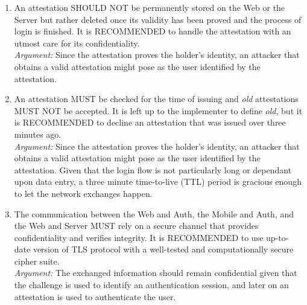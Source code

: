 \begin{enumerate}
            \item An attestation SHOULD NOT be permanently stored on the Web or the Server but rather deleted once its 
                  validity has been proved and the process of login is finished. It is RECOMMENDED to handle the 
                  attestation with an utmost care for its confidentiality.\\
            \textit{Argument:} Since the attestation proves the holder's identity, an attacker that obtains a valid
                               attestation might pose as the user identified by the attestation.

            \item An attestation MUST be checked for the time of issuing and \textit{old} attestations MUST NOT be
                  accepted. It is left up to the implementer to define \textit{old}, but it is RECOMMENDED to
                  decline an attestation that was issued over three minutes ago.\\
            \textit{Argument:} Since the attestation proves the holder's identity, an attacker that obtains a valid
                               attestation might pose as the user identified by the attestation. Given that the login
                               flow is not particularly long or dependant upon data entry, a three minute time-to-live 
                               (TTL) period is gracious enough to let the network exchanges happen.

            \item The communication between the Web and Auth, the Mobile and Auth, and the Web and Server MUST rely on 
                  a secure channel that provides confidentiality and verifies integrity. It is RECOMMENDED to use 
                  up-to-date version of TLS protocol with a well-tested and computationally secure cipher suite.\\      
            \textit{Argument:} The exchanged information should remain confidential given that the challenge is used to
                               identify an authentication session, and later on an attestation is used to authenticate the
                               user.
        \end{enumerate}


